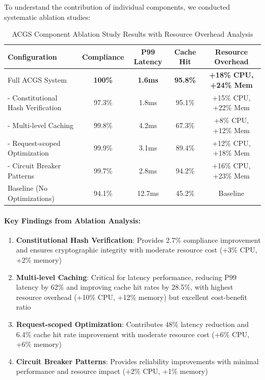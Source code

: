 \documentclass[manuscript,screen,9pt]{acmart}
\newcommand{\tablesize}{\footnotesize}
\newcommand{\tableheader}[1]{\textbf{#1}}
\begin{document}
To understand the contribution of individual components, we conducted systematic ablation studies:

\begin{table}[!htb]
\centering
\caption{ACGS Component Ablation Study Results with Resource Overhead Analysis}
\label{tab:ablation_study}
\tablesize
\begin{tabular}{@{}lcccc@{}}
\toprule
\tableheader{Configuration} & \tableheader{Compliance} & \tableheader{P99 Latency} & \tableheader{Cache Hit} & \tableheader{Resource Overhead} \\
\midrule
Full ACGS System & \textbf{100\%} & \textbf{1.6ms} & \textbf{95.8\%} & \textbf{+18\% CPU, +24\% Mem} \\
- Constitutional Hash Verification & 97.3\% & 1.8ms & 95.1\% & +15\% CPU, +22\% Mem \\
- Multi-level Caching & 99.8\% & 4.2ms & 67.3\% & +8\% CPU, +12\% Mem \\
- Request-scoped Optimization & 99.9\% & 3.1ms & 89.4\% & +12\% CPU, +18\% Mem \\
- Circuit Breaker Patterns & 99.7\% & 2.8ms & 94.2\% & +16\% CPU, +23\% Mem \\
Baseline (No Optimizations) & 94.1\% & 12.7ms & 45.2\% & Baseline \\
\bottomrule
\end{tabular}
\end{table}

\paragraph{Key Findings from Ablation Analysis:}
\begin{enumerate}[leftmargin=*,itemsep=1pt,parsep=1pt]
    \item \textbf{Constitutional Hash Verification}: Provides 2.7\% compliance improvement and ensures cryptographic integrity with moderate resource cost (+3\% CPU, +2\% memory)
    \item \textbf{Multi-level Caching}: Critical for latency performance, reducing P99 latency by 62\% and improving cache hit rates by 28.5\%, with highest resource overhead (+10\% CPU, +12\% memory) but excellent cost-benefit ratio
    \item \textbf{Request-scoped Optimization}: Contributes 48\% latency reduction and 6.4\% cache hit rate improvement with moderate resource cost (+6\% CPU, +6\% memory)
    \item \textbf{Circuit Breaker Patterns}: Provides reliability improvements with minimal performance and resource impact (+2\% CPU, +1\% memory)
\end{enumerate}
\end{document}
